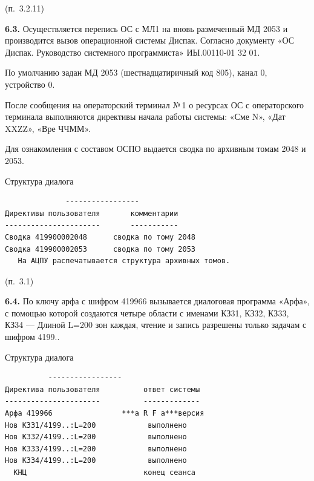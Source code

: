 \documentclass[11pt,a4paper]{article}
\begin{document}
\begin{center}(п.~3.2.11)\end{center}
\par\textbf{6.3.} Осуществляется перепись ОС с МЛ1 на вновь размеченный МД 2053 и производится вызов операционной системы Диспак. Согласно документу «ОС Диспак. Руководство системного программиста» ИЫ.00110-01 32 01.\par
По умолчанию задан МД 2053 (шестнадцатиричный код 805), канал 0, устройство 0.

После сообщения на операторский терминал №\,1 о ресурсах ОС с операторского терминала выполняются директивы начала работы системы: «Сме N», «Дат XXZZ», «Вре ЧЧММ».

Для ознакомления с составом ОСПО выдается сводка по архивным томам 2048 и 2053.

\begin{center}Структура диалога\end{center}
\begin{center}\small
\begin{BVerbatim}
              -----------------
Директивы пользователя       комментарии
----------------------       -----------
Сводка 419900002048      сводка по тому 2048
Сводка 419900002053      сводка по тому 2053
   На АЦПУ распечатывается структура архивных томов.
\end{BVerbatim}
\end{center}

\begin{center}(п.~3.1)\end{center}
\par\textbf{6.4.} По ключу арфа с шифром 419966 вызывается диалоговая программа «Арфа», с помощью которой создаются четыре области с именами КЗ31, КЗ32, КЗ33, КЗ34 --- Длиной L=200 зон каждая, чтение и запись разрешены только задачам с шифром 4199..\par
\begin{center}Структура диалога\end{center}
\begin{center}\small
\begin{BVerbatim}
          -----------------
Директива пользователя          ответ системы
----------------------          -------------
Арфа 419966                ***а R F а***версия
Нов КЗ31/4199..:L=200            выполнено
Нов КЗ32/4199..:L=200            выполнено
Нов КЗ33/4199..:L=200            выполнено
Нов КЗ34/4199..:L=200            выполнено
  КНЦ                           конец сеанса
\end{BVerbatim}
\end{center}
\end{document}
